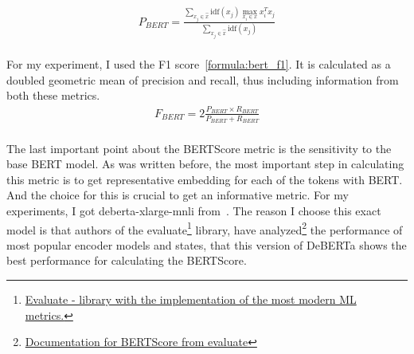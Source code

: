 \begin{align}\label{formula:bert_precision}
    P_{BERT} = \frac{\sum_{x_j \in \hat{x} } \text{idf}(x_j) \max_{x_i \in x} x_i^T x_j}{\sum_{x_j \in \hat{x}} \text{idf}(x_j)}
\end{align}\\
For my experiment, I used the F1 score~\ref{formula:bert_f1}. It is calculated as a doubled geometric mean of precision and recall, thus including information from both these metrics. 
\begin{align}\label{formula:bert_f1}
    F_{BERT} = 2\frac{P_{BERT} \times R_{BERT}}{P_{BERT} + R_{BERT}}
\end{align}\\
The last important point about the BERTScore metric is the sensitivity to the base BERT model. As was written before, the most important step in calculating this metric is to get representative embedding for each of the tokens with BERT\@. And the choice for this is crucial to get an informative metric. For my experiments, I got deberta-xlarge-mnli from~\cite{he2021deberta}. The reason I choose this exact model is that authors of the evaluate\footnote[1]{\href{https://huggingface.co/docs/evaluate/index}{Evaluate - library with the implementation of the most modern ML metrics.}} library, have analyzed\footnote[2]{\href{https://huggingface.co/spaces/evaluate-metric/bertscore}{Documentation for BERTScore from evaluate}} the performance of most popular encoder models and states, that this version of DeBERTa shows the best performance for calculating the BERTScore.